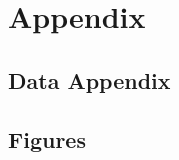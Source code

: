 \documentclass[11pt, oneside]{article}
\begin{document}
\newpage


\newpage
\section{Appendix}
\subsection{Data Appendix}


\newpage
\subsection{Figures}


\newpage

\begin{comment}


\end{comment}
\end{document}
